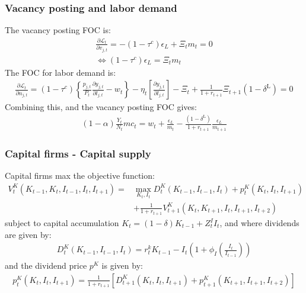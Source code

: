 \subsubsection{Vacancy posting and labor demand}
The vacancy posting FOC is: 
\begin{align*}
\frac{\partial\mathcal{L}_{t}}{\partial v_{j,t}}=-\left(1-\tau^{c}\right)\epsilon_{L}+\Xi_{t}m_{t}=0 \\
\Leftrightarrow\left(1-\tau^{c}\right)\epsilon_{L}=\Xi_{t}m_{t}  
\end{align*}
The FOC for labor demand is:
\begin{gather*}
\frac{\partial\mathcal{L}_{t}}{\partial n_{j,t}}=\left(1-\tau^{c}\right)\left\{ \frac{p_{j,t}}{P_{t}}\frac{\partial y_{j,t}}{\partial l_{j,t}}-w_{t}\right\} -\eta_{t}\left[\frac{\partial y_{j,t}}{\partial l_{j,t}}\right]-\Xi_{t}+\frac{1}{1+r_{t+1}}\Xi_{t+1}\left(1-\delta^{\text{L}}\right)=0
\end{gather*}
Combining this, and the vacancy posting FOC gives:
\begin{gather*}
\left(1-\alpha\right)\frac{Y_{t}}{N_{t}}mc_{t}=w_{t}+\frac{\epsilon_{L}}{m_{t}}-\frac{\left(1-\delta^{\text{L}}\right)}{1+r_{t+1}}\frac{\epsilon_{L}}{m_{t+1}}    
\end{gather*}


\subsubsection{Capital firms - Capital supply}
Capital firms max the objective function:
\begin{align*}
V_{t}^{K}\left(K_{t-1},K_{t},I_{t-1},I_{t},I_{t+1}\right)=&\max_{K_{t},I_{t}}D_{t}^{K}\left(K_{t-1},I_{t-1},I_{t}\right)+p_{t}^{K}\left(K_{t},I_{t},I_{t+1}\right) \\
&+\frac{1}{1+r_{t+1}}V_{t+1}^{K}\left(K_{t},K_{t+1},I_{t},I_{t+1},I_{t+2}\right)
\end{align*}
subject to capital accumulation $K_{t}=\left(1-\delta\right)K_{t-1}+Z_{t}^{I}I_{t}$, and where dividends are given by:
\begin{gather*}
D_{t}^{K}\left(K_{t-1},I_{t-1},I_{t}\right)=r_{t}^{k}K_{t-1}-I_{t}\left(1+\phi_{I}\left(\frac{I_{t}}{I_{t-1}}\right)\right)
\end{gather*}
and the dividend price $p^K$ is given by:
\begin{gather*}
p_{t}^{K}\left(K_{t},I_{t},I_{t+1}\right)=\frac{1}{1+r_{t+1}}\left[D_{t+1}^{K}\left(K_{t},I_{t},I_{t+1}\right)+p_{t+1}^{K}\left(K_{t+1},I_{t+1},I_{t+2}\right)\right]
\end{gather*}


